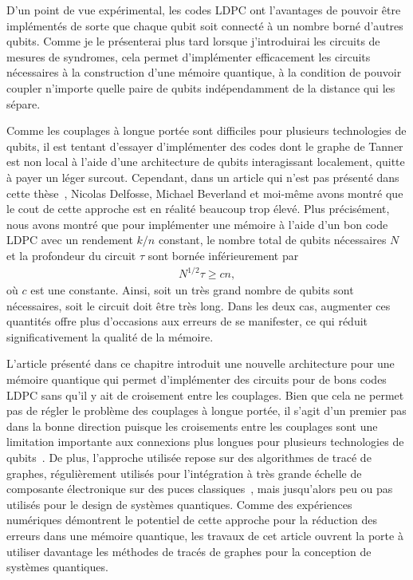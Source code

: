 D'un point de vue expérimental,
les codes LDPC ont l'avantages de pouvoir être implémentés de sorte que 
chaque qubit soit connecté à un nombre borné d'autres qubits.
Comme je le présenterai plus tard lorsque j'introduirai les circuits
de mesures de syndromes,
cela permet d'implémenter efficacement les circuits nécessaires à la
construction d'une mémoire quantique,
à la condition de pouvoir coupler n'importe quelle paire de qubits 
indépendamment de la distance qui les sépare.

Comme les couplages à longue portée sont difficiles pour plusieurs technologies de qubits,
il est tentant d'essayer d'implémenter des codes dont le graphe de Tanner est non local
à l'aide d'une architecture de qubits interagissant localement,
quitte à payer un léger surcout.
Cependant,
dans un article qui n'est pas présenté dans cette thèse~\cite{delfosse_bounds_2021},
Nicolas Delfosse, Michael Beverland et moi-même avons montré que le cout de cette approche
est en réalité beaucoup trop élevé.
Plus précisément,
nous avons montré que pour implémenter une mémoire à l'aide d'un bon code LDPC
avec un rendement $k/n$ constant,
le nombre total de qubits nécessaires $N$ et la profondeur du circuit $\tau$ sont 
bornée inférieurement par 
\begin{align}
	N^{1/2} \tau \geq c n,
\end{align}
où $c$ est une constante.
Ainsi,
soit un très grand nombre de qubits sont nécessaires,
soit le circuit doit être très long.
Dans les deux cas,
augmenter ces quantités offre plus d'occasions aux erreurs de se manifester,
ce qui réduit significativement la qualité de la mémoire.

L'article présenté dans ce chapitre introduit une nouvelle architecture pour une mémoire quantique
qui permet d'implémenter des circuits pour de bons codes LDPC sans qu'il y ait de
croisement entre les couplages.
Bien que cela ne permet pas de régler le problème des couplages à longue portée,
il s'agit d'un premier pas dans la bonne direction puisque les croisements
entre les couplages sont une limitation importante aux connexions plus longues
pour plusieurs technologies de
qubits~\cite{sarovar_detecting_2020, debnath_demonstration_2016, neill_blueprint_2018, ash-saki_analysis_2020}.
De plus,
l'approche utilisée repose sur des algorithmes de tracé de graphes,
régulièrement utilisés pour l'intégration à très grande échelle de composante électronique
sur des puces classiques~\cite{leighton_complexity_1983},
mais jusqu'alors peu ou pas utilisés pour le design de systèmes quantiques.
Comme des expériences numériques démontrent le potentiel de cette approche pour la réduction
des erreurs dans une mémoire quantique,
les travaux de cet article ouvrent la porte à utiliser davantage les méthodes 
de tracés de graphes pour la conception de systèmes quantiques.

